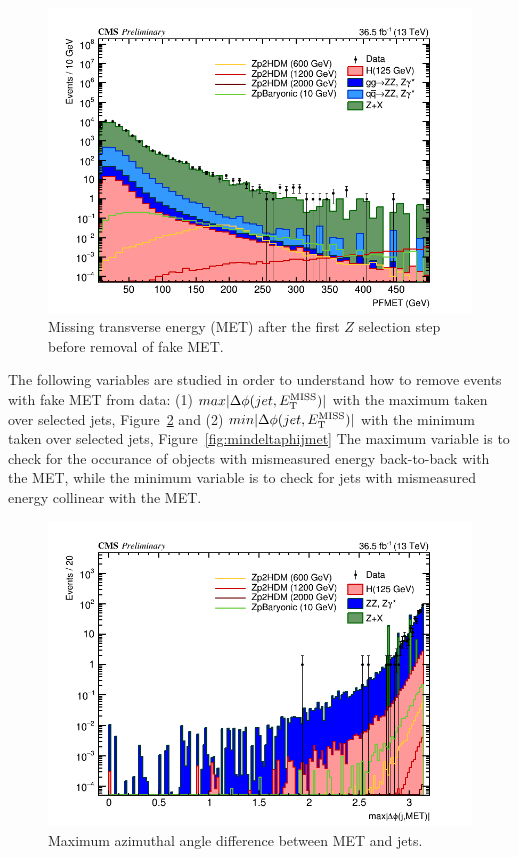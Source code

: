 \begin{figure}[tbh]
\centering
\includegraphics[width=5in]{figures/hist_hPFMET_3.png}
\caption{Missing transverse energy (MET) after the first $Z$ selection step before removal of fake MET.}
\label{fig:pfmet_m4lblinded}
\end{figure}

The following variables are studied in order to understand how to remove events with fake MET from data: (1) $max|\Delta\phi(jet, E_{\rm{T}}^{\rm{MISS}})|$ with the maximum taken over selected jets, Figure~\ref{fig:maxdeltaphijmet} and (2) $min|\Delta\phi(jet, E_{\rm{T}}^{\rm{MISS}})|$ with the minimum taken over selected jets, Figure~\ref{fig:mindeltaphijmet}
The maximum variable is to check for the occurance of objects with mismeasured energy back-to-back with the MET, while the minimum variable is to check for jets with mismeasured energy collinear with the MET.

\begin{figure}[tbh]
\centering
\includegraphics[width=5in]{figures/hist_hDPHI_MAX_JET_MET_8.png}
\caption{Maximum azimuthal angle difference between MET and jets.}
\label{fig:maxdeltaphijmet}
\end{figure}


